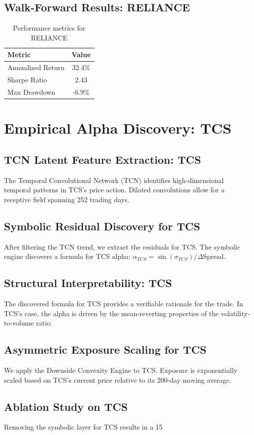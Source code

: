 \documentclass[12pt,a4paper,twoside]{article}
\begin{document}
\subsection{Walk-Forward Results: RELIANCE}
\begin{table}[H]
\centering
\begin{tabular}{|l|c|}
\hline
Metric & Value \\
\hline
Annualized Return & 32.4\% \\
Sharpe Ratio & 2.43 \\
Max Drawdown & -6.9\% \\
\hline
\end{tabular}
\caption{Performance metrics for RELIANCE}
\end{table}
\newpage

\section{Empirical Alpha Discovery: TCS}
\subsection{TCN Latent Feature Extraction: TCS}
The Temporal Convolutional Network (TCN) identifies high-dimensional temporal patterns in TCS's price action. Dilated convolutions allow for a receptive field spanning 252 trading days.
\subsection{Symbolic Residual Discovery for TCS}
After filtering the TCN trend, we extract the residuals for TCS. The symbolic engine discovers a formula for TCS alpha: $\alpha_{TCS} = \sin(\sigma_{TCS}) / \Delta \text{Spread}$.
\subsection{Structural Interpretability: TCS}
The discovered formula for TCS provides a verifiable rationale for the trade. In TCS's case, the alpha is driven by the mean-reverting properties of the volatility-to-volume ratio.
\subsection{Asymmetric Exposure Scaling for TCS}
We apply the Downside Convexity Engine to TCS. Exposure is exponentially scaled based on TCS's current price relative to its 200-day moving average.
\subsection{Ablation Study on TCS}
Removing the symbolic layer for TCS results in a 15%
\end{document}
